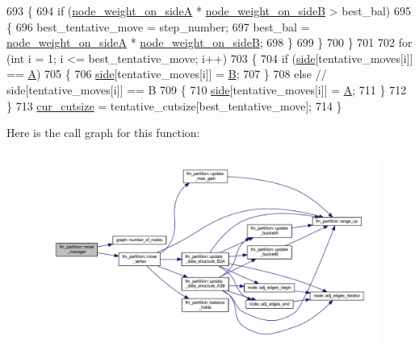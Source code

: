 \begin{DoxyCode}
693     \{
694         \textcolor{keywordflow}{if} (\mbox{\hyperlink{classfm__partition_a8a50d15b399c9ed35d6987c8fb68aa2b}{node\_weight\_on\_sideA}} * \mbox{\hyperlink{classfm__partition_a6dc967e385b31096a85f17c51f1f0824}{node\_weight\_on\_sideB}} > best\_bal)
695         \{
696         best\_tentative\_move = step\_number;
697         best\_bal = \mbox{\hyperlink{classfm__partition_a8a50d15b399c9ed35d6987c8fb68aa2b}{node\_weight\_on\_sideA}} * 
      \mbox{\hyperlink{classfm__partition_a6dc967e385b31096a85f17c51f1f0824}{node\_weight\_on\_sideB}};
698         \}
699     \}
700     \}
701 
702     \textcolor{keywordflow}{for} (\textcolor{keywordtype}{int} i = 1; i <= best\_tentative\_move; i++)
703     \{
704     \textcolor{keywordflow}{if} (\mbox{\hyperlink{classfm__partition_af83309e781e9658fc0ff923ced087bfc}{side}}[tentative\_moves[i]] == \mbox{\hyperlink{classfm__partition_a738e75c601403754e61e6dac623fd3ab}{A}})
705     \{
706         \mbox{\hyperlink{classfm__partition_af83309e781e9658fc0ff923ced087bfc}{side}}[tentative\_moves[i]] = \mbox{\hyperlink{classfm__partition_a42515c44eecb7ba3e2ec549a877ef238}{B}};
707     \}
708     \textcolor{keywordflow}{else}    \textcolor{comment}{// side[tentative\_moves[i]] == B}
709     \{
710         \mbox{\hyperlink{classfm__partition_af83309e781e9658fc0ff923ced087bfc}{side}}[tentative\_moves[i]] = \mbox{\hyperlink{classfm__partition_a738e75c601403754e61e6dac623fd3ab}{A}};
711     \}
712     \}
713     \mbox{\hyperlink{classfm__partition_abc8f24c354d2a15f8ec8ef9a46252c93}{cur\_cutsize}} = tentative\_cutsize[best\_tentative\_move];
714 \}
\end{DoxyCode}
Here is the call graph for this function\+:\nopagebreak
\begin{figure}[H]
\begin{center}
\leavevmode
\includegraphics[width=350pt]{classfm__partition_a91572409b30f0967ea3782079f69b1bb_cgraph}
\end{center}
\end{figure}
